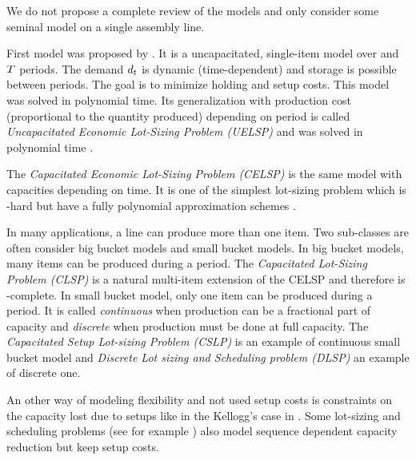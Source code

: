 We do not propose a complete review of the models and only consider some seminal model on a single assembly line.

\medskip

First model was proposed by \cite{Wagner1958}. It is a uncapacitated, single-item model over and $T$ periods. The demand $d_t$ is dynamic (\ie time-dependent) and storage is possible between periods. The goal is to minimize holding and setup costs. This model was solved in polynomial time.
Its generalization with production cost (proportional to the quantity produced) depending on period is called \emph{Uncapacitated Economic Lot-Sizing Problem (UELSP)} and was solved in polynomial time \cite{Federgruen1991,Wagelmans1992,Aggarwal1993}.


The \emph{Capacitated Economic Lot-Sizing Problem (CELSP)} is the same model with capacities depending on time. It is one of the simplest lot-sizing problem which is \NP-hard \cite{Florian1980} but have a fully polynomial approximation schemes \cite{vanHoesel2001}.

\medskip

In many applications, a line can produce more than one item. Two sub-classes are often consider big bucket models and small bucket models.
In big bucket models, many items can be produced during a period.
The \emph{Capacitated Lot-Sizing Problem (CLSP)} is a natural multi-item extension of the CELSP and therefore is \NP-complete.
In small bucket model, only one item can be produced during a period. It is called \emph{continuous} when production can be a fractional part of capacity and \emph{discrete} when production must be done at full capacity. The \emph{Capacitated Setup Lot-sizing Problem (CSLP)} is an example of continuous small bucket model and \emph{Discrete Lot sizing and Scheduling problem (DLSP)} an example of discrete one.

\medskip

An other way of modeling flexibility and not used setup costs is constraints on the capacity lost due to setups like in the Kellogg's case in \cite[Chapter 4]{Pochet2006}. Some lot-sizing and scheduling problems (see for example \cite{Guimaraes2014}) also model sequence dependent capacity reduction but keep setup costs.




